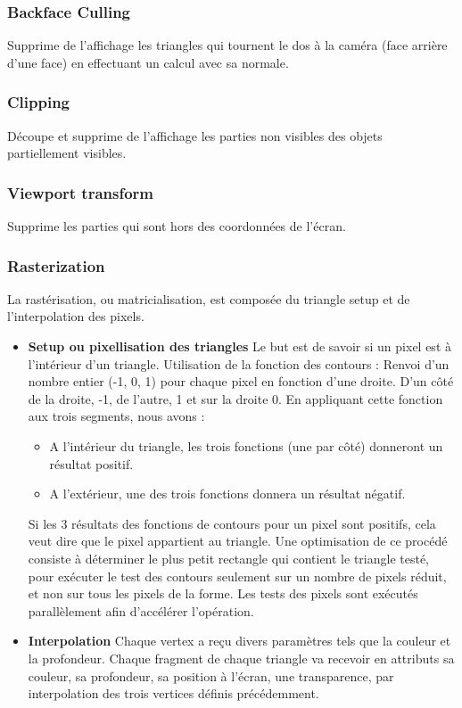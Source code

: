 \subsubsection{Backface Culling}
Supprime de l’affichage les triangles qui  tournent le dos à la caméra (face arrière d’une face) en effectuant un calcul avec sa normale.
\subsubsection{Clipping}
Découpe et supprime de l’affichage les parties non visibles des objets partiellement visibles.
\subsubsection{Viewport transform}
Supprime les parties qui sont hors des coordonnées de l’écran.

\subsubsection{Rasterization}
La rastérisation, ou matricialisation, est composée du triangle setup et de l’interpolation des pixels.
\begin{itemize}
  \item{\textbf{Setup ou pixellisation des triangles}}
Le but est de savoir si un pixel est à l'intérieur d'un triangle.
Utilisation de la fonction des contours : Renvoi d’un nombre entier (-1, 0, 1) pour chaque pixel en fonction d’une droite. D’un côté de la droite, -1, de l’autre, 1 et sur la droite 0.
En appliquant cette fonction aux trois segments, nous avons :
\begin{itemize}
	\item A l'intérieur du triangle, les trois fonctions (une par côté) donneront un résultat positif.
	\item A l'extérieur, une des trois fonctions donnera un résultat négatif.
\end{itemize}
Si les 3 résultats des fonctions de contours pour un pixel sont positifs, cela veut dire que le pixel appartient au triangle.
Une optimisation de ce procédé consiste à déterminer le plus petit rectangle qui contient le triangle testé, pour exécuter le test des contours seulement sur un nombre de pixels réduit, et non sur tous les pixels de la forme.
Les tests des pixels sont exécutés parallèlement afin d'accélérer l'opération.
\item{\textbf{Interpolation}}
Chaque vertex a reçu divers paramètres tels que la couleur et la profondeur. Chaque fragment de chaque triangle va recevoir en attributs sa couleur, sa profondeur, sa position à l’écran, une transparence, par interpolation des trois vertices définis précédemment.
\end{itemize}
